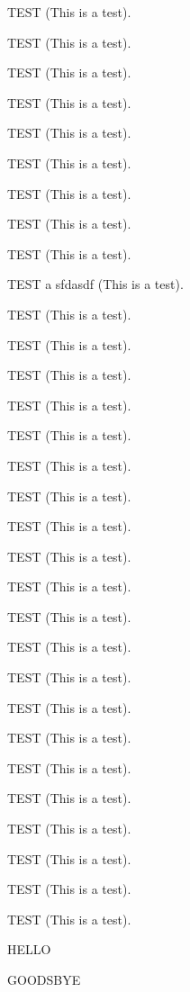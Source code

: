 TEST
(This is a test).

TEST
(This is a test).

TEST
(This is a test).

TEST
(This is a test).

TEST
(This is a test).

TEST
(This is a test).

TEST
(This is a test).

TEST
(This is a test).

TEST
(This is a test).


TEST a sfdasdf 
(This is a test).

TEST
(This is a test).

TEST
(This is a test).

TEST
(This is a test).

TEST
(This is a test).

TEST
(This is a test).

TEST
(This is a test).

TEST
(This is a test).

TEST
(This is a test).

TEST
(This is a test).

TEST
(This is a test).

TEST
(This is a test).

TEST
(This is a test).

TEST
(This is a test).

TEST
(This is a test).

TEST
(This is a test).

TEST
(This is a test).

TEST
(This is a test).

TEST
(This is a test).

TEST
(This is a test).

TEST
(This is a test).

TEST
(This is a test).

HELLO

GOODSBYE

